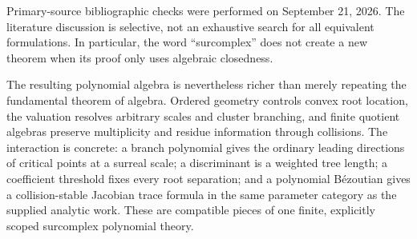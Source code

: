 \documentclass[11pt,letterpaper,oneside]{article}
\numberwithin{equation}{section}
\theoremstyle{definition}
\theoremstyle{remark}\newtheorem{remark}[theorem]{Remark}
\begin{document}
Primary-source bibliographic checks were performed on September 21, 2026.
The literature discussion is selective, not an exhaustive search for all
equivalent formulations. In particular, the word ``surcomplex'' does not
create a new theorem when its proof only uses algebraic closedness.

The resulting polynomial algebra is nevertheless richer than merely
repeating the fundamental theorem of algebra. Ordered geometry controls
convex root location, the valuation resolves arbitrary scales and cluster
branching, and finite quotient algebras preserve multiplicity and residue
information through collisions. The interaction is concrete: a branch
polynomial gives the ordinary leading directions of critical points at a
surreal scale; a discriminant is a weighted tree length; a coefficient
threshold fixes every root separation; and a polynomial B\'ezoutian gives
a collision-stable Jacobian trace formula in the same parameter category
as the supplied analytic work. These are compatible pieces of one finite,
explicitly scoped surcomplex polynomial theory.

\appendix
\end{document}
